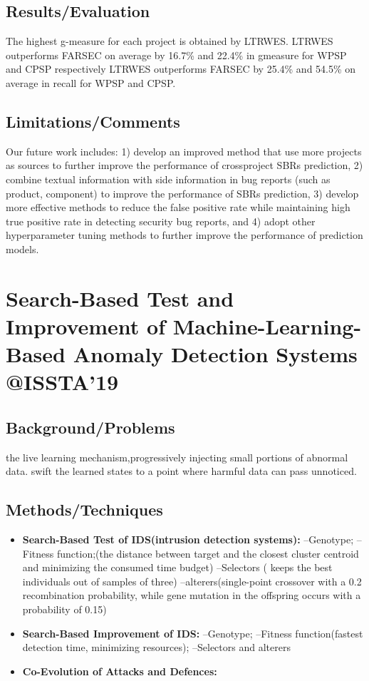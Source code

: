 \subsection{Results/Evaluation}
The highest g-measure for each project is obtained by LTRWES. LTRWES outperforms FARSEC on average by 16.7\% and 22.4\% in gmeasure for WPSP and CPSP respectively
LTRWES outperforms FARSEC by 25.4\% and 54.5\% on average in recall for WPSP and CPSP.
\subsection{Limitations/Comments}
Our future work includes: 1) develop an improved method that use more projects as sources to further improve the performance of crossproject SBRs prediction, 2) combine textual information with side information in bug reports (such as product, component) to improve the performance of SBRs prediction, 3) develop more effective methods to reduce the false positive rate while maintaining high true positive rate in detecting security bug reports, and 4) adopt other hyperparameter tuning methods to further improve the performance of prediction models.
\newpage

\section{Search-Based Test and Improvement of Machine-Learning-Based Anomaly Detection Systems @ISSTA'19}
\subsection{Background/Problems}
the live learning mechanism,progressively injecting small portions of abnormal data. swift the learned states to a point where harmful data can pass unnoticed.
\subsection{Methods/Techniques}
\begin{itemize}
	\item \textbf{Search-Based Test of IDS(intrusion detection systems):}
          --Genotype;
          --Fitness function;(the distance between target and the closest cluster centroid and minimizing the consumed time budget)
         --Selectors ( keeps the best individuals out of samples of three)
         --alterers(single-point crossover with a 0.2 recombination probability, while gene mutation in the offspring occurs with a probability of 0.15)
    \item \textbf{Search-Based Improvement of IDS:}
          --Genotype;
          --Fitness function(fastest detection time, minimizing resources);
          --Selectors and alterers
	\item \textbf{Co-Evolution of Attacks and Defences:}	  
\end{itemize}


